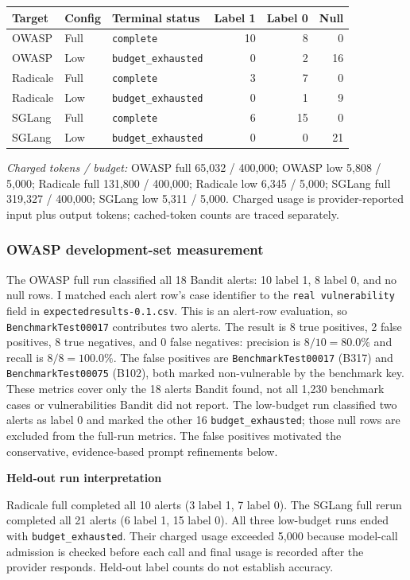 \documentclass[11pt]{article}
\begin{document}
\begin{center}
\small
\begin{tabular}{@{}lllrrr@{}}
\toprule
\textbf{Target} & \textbf{Config} & \textbf{Terminal status} & \textbf{Label 1} & \textbf{Label 0} & \textbf{Null} \\
\midrule
OWASP & Full & \texttt{complete} & 10 & 8 & 0 \\
OWASP & Low & \texttt{budget\_exhausted} & 0 & 2 & 16 \\
Radicale & Full & \texttt{complete} & 3 & 7 & 0 \\
Radicale & Low & \texttt{budget\_exhausted} & 0 & 1 & 9 \\
SGLang & Full & \texttt{complete} & 6 & 15 & 0 \\
SGLang & Low & \texttt{budget\_exhausted} & 0 & 0 & 21 \\
\bottomrule
\end{tabular}
\end{center}
\noindent\textit{Charged tokens / budget:} OWASP full 65,032 / 400,000; OWASP low 5,808 / 5,000; Radicale full 131,800 / 400,000; Radicale low 6,345 / 5,000; SGLang full 319,327 / 400,000; SGLang low 5,311 / 5,000. Charged usage is provider-reported input plus output tokens; cached-token counts are traced separately.

\subsubsection*{OWASP development-set measurement}
The OWASP full run classified all 18 Bandit alerts: 10 label 1, 8 label 0, and no null rows. I matched each alert row's case identifier to the \texttt{real vulnerability} field in \texttt{expectedresults-0.1.}\allowbreak\texttt{csv}. This is an alert-row evaluation, so \texttt{BenchmarkTest00017} contributes two alerts. The result is 8 true positives, 2 false positives, 8 true negatives, and 0 false negatives: precision is \(8/10=80.0\%\) and recall is \(8/8=100.0\%\). The false positives are \texttt{BenchmarkTest00017} (B317) and \texttt{BenchmarkTest00075} (B102), both marked non-vulnerable by the benchmark key. These metrics cover only the 18 alerts Bandit found, not all 1,230 benchmark cases or vulnerabilities Bandit did not report. The low-budget run classified two alerts as label 0 and marked the other 16 \texttt{budget\_exhausted}; those null rows are excluded from the full-run metrics. The false positives motivated the conservative, evidence-based prompt refinements below.

\noindent\textbf{Held-out run interpretation}\par\nobreak\noindent Radicale full completed all 10 alerts (3 label 1, 7 label 0). The SGLang full rerun completed all 21 alerts (6 label 1, 15 label 0). All three low-budget runs ended with \texttt{budget\_exhausted}. Their charged usage exceeded 5,000 because model-call admission is checked before each call and final usage is recorded after the provider responds. Held-out label counts do not establish accuracy.
\end{document}
